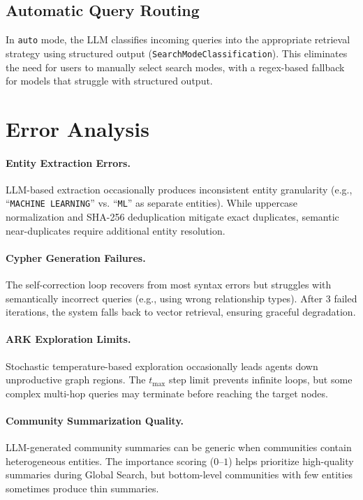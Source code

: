 \documentclass[11pt]{article}
\begin{document}
\subsection{Automatic Query Routing}

In \texttt{auto} mode, the LLM classifies incoming queries into the appropriate retrieval strategy using structured output (\texttt{SearchModeClassification}). This eliminates the need for users to manually select search modes, with a regex-based fallback for models that struggle with structured output.

\section{Error Analysis}

\paragraph{Entity Extraction Errors.} LLM-based extraction occasionally produces inconsistent entity granularity (e.g., ``\texttt{MACHINE LEARNING}'' vs. ``\texttt{ML}'' as separate entities). While uppercase normalization and SHA-256 deduplication mitigate exact duplicates, semantic near-duplicates require additional entity resolution.

\paragraph{Cypher Generation Failures.} The self-correction loop recovers from most syntax errors but struggles with semantically incorrect queries (e.g., using wrong relationship types). After 3 failed iterations, the system falls back to vector retrieval, ensuring graceful degradation.

\paragraph{ARK Exploration Limits.} Stochastic temperature-based exploration occasionally leads agents down unproductive graph regions. The $t_{\max}$ step limit prevents infinite loops, but some complex multi-hop queries may terminate before reaching the target nodes.

\paragraph{Community Summarization Quality.} LLM-generated community summaries can be generic when communities contain heterogeneous entities. The importance scoring ($0$--$1$) helps prioritize high-quality summaries during Global Search, but bottom-level communities with few entities sometimes produce thin summaries.
\end{document}
